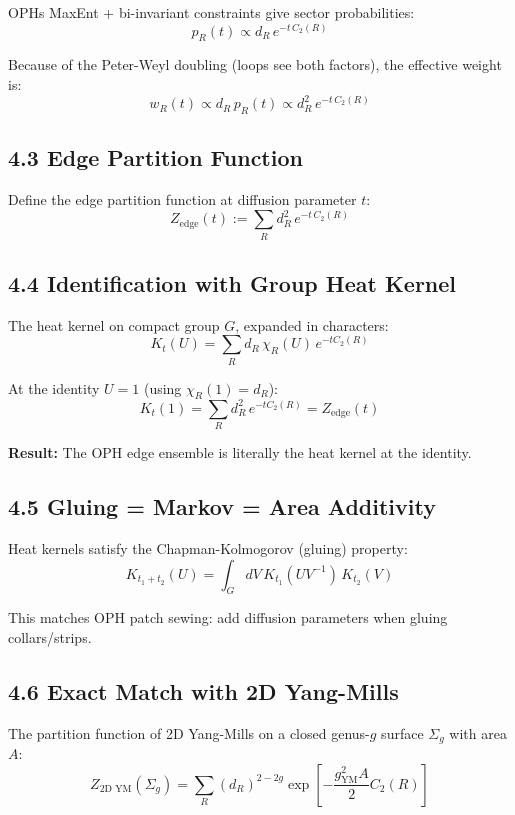 OPH\textquotesingle s MaxEnt + bi-invariant constraints give sector probabilities: \[p_R(t) \propto d_R \, e^{-t \, C_2(R)}\]

Because of the Peter-Weyl doubling (loops see both factors), the effective weight is: \[w_R(t) \propto d_R \, p_R(t) \propto d_R^2 \, e^{-t \, C_2(R)}\]

\subsection{4.3 Edge Partition Function}\label{43-edge-partition-function}

Define the edge partition function at diffusion parameter \(t\): \[Z_{\text{edge}}(t) := \sum_R d_R^2 \, e^{-t \, C_2(R)}\]

\subsection{4.4 Identification with Group Heat Kernel}\label{44-identification-with-group-heat-kernel}

The heat kernel on compact group \(G\), expanded in characters: \[K_t(U) = \sum_R d_R \, \chi_R(U) \, e^{-t C_2(R)}\]

At the identity \(U = 1\) (using \(\chi_R(1) = d_R\)): \[K_t(1) = \sum_R d_R^2 \, e^{-t C_2(R)} = Z_{\text{edge}}(t)\]

\textbf{Result:} The OPH edge ensemble is literally the heat kernel at the identity.

\subsection{4.5 Gluing = Markov = Area Additivity}\label{45-gluing--markov--area-additivity}

Heat kernels satisfy the Chapman-Kolmogorov (gluing) property: \[K_{t_1 + t_2}(U) = \int_G dV \, K_{t_1}(UV^{-1}) \, K_{t_2}(V)\]

This matches OPH patch sewing: add diffusion parameters when gluing collars/strips.

\subsection{4.6 Exact Match with 2D Yang-Mills}\label{46-exact-match-with-2d-yang-mills}

The partition function of 2D Yang-Mills on a closed genus-\(g\) surface \(\Sigma_g\) with area \(A\): \[Z_{\text{2D YM}}(\Sigma_g) = \sum_R (d_R)^{2-2g} \exp\left[-\frac{g_{\text{YM}}^2 A}{2} C_2(R)\right]\]

